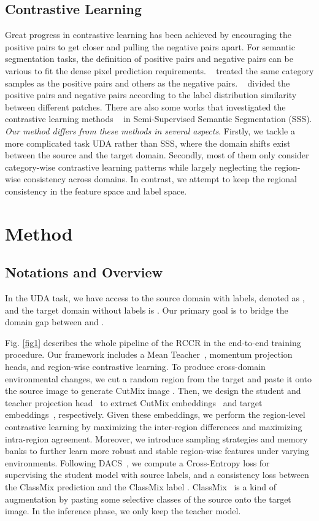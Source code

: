\documentclass{article}
\begin{document}
\subsection{Contrastive Learning}

Great progress in contrastive learning has been achieved  by encouraging the positive pairs to get closer and pulling the negative pairs apart. For semantic segmentation tasks,  the definition of positive pairs and negative pairs can be various to fit the dense pixel prediction requirements. ~\cite{wang2021exploring} treated the same category samples as the positive pairs and others as the negative pairs. ~\cite{liu2021domain} divided the positive pairs and negative pairs according to the label distribution similarity between different patches. There are also some works that investigated the contrastive learning methods ~\cite{lai2021semi} in Semi-Supervised Semantic Segmentation (SSS). \textit{Our method differs from these methods in several aspects}. Firstly, we tackle a more complicated task UDA rather than SSS, where the domain shifts exist between the source and the target domain. Secondly, most of them only consider category-wise contrastive learning patterns while largely neglecting the region-wise consistency across domains. In contrast, we attempt to keep the regional consistency in the feature space and label space.

\section{Method}



\subsection{Notations and Overview}
\label{sec:3.1}
In the UDA task, we have access to the source domain with labels, denoted as  , and the target domain without labels is  . Our primary goal is to bridge the domain gap between  and .


Fig. \ref{fig1} describes the whole pipeline of the RCCR in the end-to-end training procedure. Our framework includes a Mean Teacher~\cite{choi2019self}, momentum projection heads, and region-wise contrastive learning. To produce cross-domain environmental changes, we cut a random region from the target and paste it onto the source image to generate CutMix image . Then, we design the student and teacher projection head~ to extract CutMix embeddings~ and target embeddings~, respectively. Given these embeddings, we perform the region-level contrastive learning by maximizing  the  inter-region  differences  and  maximizing intra-region agreement. Moreover, we introduce sampling strategies and memory banks to further learn more robust and stable region-wise features under varying environments.  Following DACS~\cite{tranheden2020dacs}, we compute a Cross-Entropy loss  for supervising the student model with source labels, and a consistency loss  between the ClassMix prediction  and the ClassMix label .  ClassMix~\cite{tranheden2020dacs} is a kind of augmentation by pasting some selective classes of the source onto the target image.
In the inference phase, we only keep the teacher model. 
\end{document}
